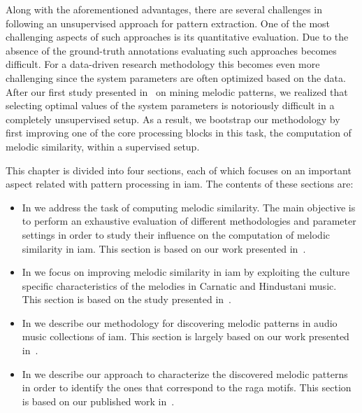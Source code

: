 Along with the aforementioned advantages, there are several challenges in following an unsupervised approach for pattern extraction. One of the most challenging aspects of such approaches is its quantitative evaluation. Due to the absence of the ground-truth annotations evaluating such approaches becomes difficult. For a data-driven research methodology this becomes even more challenging since the system parameters are often optimized based on the data. After our first study presented in~\cite{gulati_SITIS_2014} on mining melodic patterns, we realized that selecting optimal values of the system parameters is notoriously difficult in a completely unsupervised setup. As a result, we bootstrap our methodology by first improving one of the core processing blocks in this task, the computation of melodic similarity, within a supervised setup. 

This chapter is divided into four sections, each of which focuses on an important aspect related with pattern processing in \gls{iam}. The contents of these sections are:
\begin{itemize}
	\item In  we address the task of computing melodic similarity. The main objective is to perform an exhaustive evaluation of different methodologies and parameter settings in order to study their influence on the computation of melodic similarity  in \gls{iam}. This section is based on our work presented in~\cite{gulati_ICASSP2015}.
	\item In  we focus on improving melodic similarity in \gls{iam} by exploiting the culture specific characteristics of the melodies in Carnatic and Hindustani music. This section is based on the study presented in~\cite{gulati_ISMIR_2015}.
	\item In  we describe our methodology for discovering melodic patterns in audio music collections of \gls{iam}. This section is largely based on our work presented in~\cite{gulati_SITIS_2014}.
	\item In  we describe our approach to characterize the discovered melodic patterns in order to identify the ones that correspond to the \gls{raga} motifs. This section is based on our published work in~\cite{gulati_communities_2016}.
\end{itemize}




